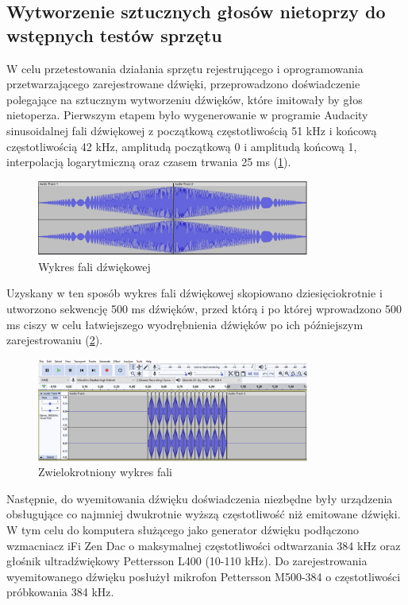 \documentclass{sprz}
\begin{document}
\subsection{Wytworzenie sztucznych głosów nietoprzy do wstępnych testów sprzętu}

W celu przetestowania działania sprzętu rejestrującego i oprogramowania przetwarzającego zarejestrowane dźwięki, przeprowadzono doświadczenie polegające na sztucznym wytworzeniu dźwięków, które imitowały by głos nietoperza.
Pierwszym etapem było wygenerowanie w programie Audacity sinusoidalnej fali dźwiękowej z początkową częstotliwością 51 kHz i końcową częstotliwością 42 kHz, amplitudą początkową 0 i amplitudą końcową 1, interpolacją logarytmiczną oraz czasem trwania 25 ms (\ref{img:wykres_fali}).

\begin{figure}[h]
    \centering
    \includegraphics[width=0.8\textwidth]{sprz/wykres_fali}
    \caption{Wykres fali dźwiękowej}
    \label{img:wykres_fali}
\end{figure}

Uzyskany w ten sposób wykres fali dźwiękowej skopiowano dziesięciokrotnie i utworzono sekwencję 500 ms dźwięków, przed którą i po której wprowadzono 500 ms ciszy w celu łatwiejszego wyodrębnienia dźwięków po ich późniejszym zarejestrowaniu (\ref{img:wykres_fali_wielokrotnej}).

\begin{figure}[h]
    \centering
    \includegraphics[width=0.8\textwidth]{sprz/wykres_fali_wielokrotnej}
    \caption{Zwielokrotniony wykres fali}
    \label{img:wykres_fali_wielokrotnej}
\end{figure}

Następnie, do wyemitowania dźwięku doświadczenia niezbędne były urządzenia obsługujące co najmniej dwukrotnie wyższą częstotliwość niż emitowane dźwięki. W tym celu do komputera służącego jako generator dźwięku podłączono wzmacniacz iFi Zen Dac o maksymalnej częstotliwości odtwarzania 384 kHz oraz głośnik ultradźwiękowy Pettersson L400 (10-110 kHz). Do zarejestrowania wyemitowanego dźwięku posłużył mikrofon Pettersson M500-384 o częstotliwości próbkowania 384 kHz.
\end{document}
